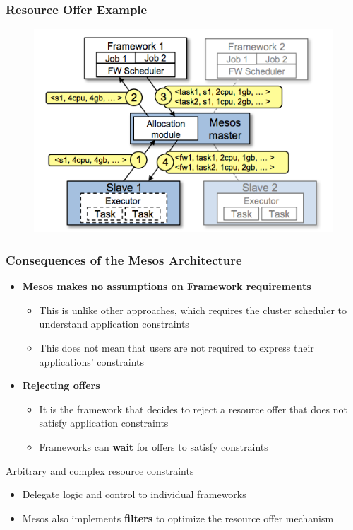 \begin{frame}
\frametitle{Resource Offer Example}
\begin{figure}[h]
  \centering
  \includegraphics[scale=0.6]{./figures/mesos_arch_example}
  \label{fig:mesos_arch_example}
\end{figure}
\end{frame}

\begin{frame}
\frametitle{Consequences of the Mesos Architecture}
\begin{itemize}
	\item {\bf Mesos makes no assumptions on Framework requirements}
	\begin{itemize}
		\item This is unlike other approaches, which requires the cluster scheduler to understand application constraints
		\item This does not mean that users are not required to express their applications' constraints
	\end{itemize}

	\item {\bf Rejecting offers}
	\begin{itemize}
		\item It is the framework that decides to reject a resource offer that does not satisfy application constraints
		\item Frameworks can {\bf wait} for offers to satisfy constraints
	\end{itemize}
\end{itemize}

\begin{block}{Arbitrary and complex resource constraints}
\begin{itemize}
	\item Delegate logic and control to individual frameworks
	\item Mesos also implements {\bf filters} to optimize the resource offer mechanism
\end{itemize}
\end{block}
\end{frame}

